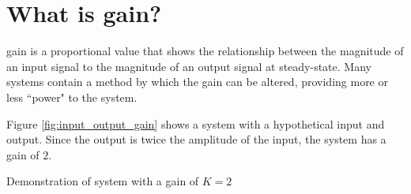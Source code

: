 \section{What is gain?}

\Gls{gain} is a proportional value that shows the relationship between the
magnitude of an input signal to the magnitude of an output signal at
steady-state. Many \glspl{system} contain a method by which the gain can be
altered, providing more or less ``power" to the \gls{system}.

Figure \ref{fig:input_output_gain} shows a \gls{system} with a hypothetical
input and output. Since the output is twice the amplitude of the input, the
\gls{system} has a gain of $2$.

\begin{bookfigure}

  \caption{Demonstration of system with a gain of $K = 2$}
  \label{fig:input_output_gain}
\end{bookfigure}
